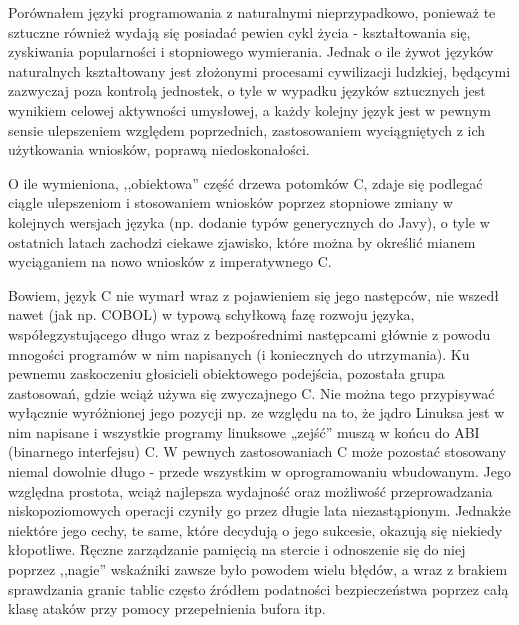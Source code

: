 Porównałem języki programowania z naturalnymi nieprzypadkowo, ponieważ te sztuczne również wydają się posiadać pewien cykl życia - kształtowania się, zyskiwania popularności i stopniowego wymierania. Jednak o ile żywot języków naturalnych kształtowany jest złożonymi procesami cywilizacji ludzkiej, będącymi zazwyczaj poza kontrolą jednostek, o tyle w wypadku języków sztucznych jest wynikiem celowej aktywności umysłowej, a każdy kolejny język jest w pewnym sensie ulepszeniem względem poprzednich, zastosowaniem wyciągniętych z ich użytkowania wniosków, poprawą niedoskonałości.\cite{valverde2015}

O ile wymieniona, ,,obiektowa'' część drzewa potomków C, zdaje się podlegać ciągle ulepszeniom i stosowaniem wniosków poprzez stopniowe zmiany w kolejnych wersjach języka (np. dodanie typów generycznych do Javy), o tyle w ostatnich latach zachodzi ciekawe zjawisko, które można by określić mianem wyciąganiem na nowo wniosków z imperatywnego C.

Bowiem, język C nie wymarł wraz z pojawieniem się jego następców, nie wszedł nawet (jak np. COBOL) w typową schyłkową fazę rozwoju języka, współegzystującego długo wraz z bezpośrednimi następcami głównie z powodu mnogości programów w nim napisanych (i koniecznych do utrzymania). Ku pewnemu zaskoczeniu głosicieli obiektowego podejścia, pozostała grupa zastosowań, gdzie wciąż używa się zwyczajnego C. Nie można tego przypisywać wyłącznie wyróżnionej jego pozycji np. ze względu na to, że jądro Linuksa jest w nim napisane i wszystkie programy linuksowe „zejść” muszą w końcu do ABI (binarnego interfejsu) C. W pewnych zastosowaniach C może pozostać stosowany niemal dowolnie długo - przede wszystkim w oprogramowaniu wbudowanym. Jego względna prostota, wciąż najlepsza wydajność oraz możliwość przeprowadzania niskopoziomowych operacji czyniły go przez długie lata niezastąpionym. Jednakże niektóre jego cechy, te same, które decydują o jego sukcesie, okazują się niekiedy kłopotliwe. Ręczne zarządzanie pamięcią na stercie i odnoszenie się do niej poprzez ,,nagie'' wskaźniki zawsze było powodem wielu błędów, a wraz z brakiem sprawdzania granic tablic często źródłem podatności bezpieczeństwa poprzez całą klasę ataków przy pomocy przepełnienia bufora itp. 

